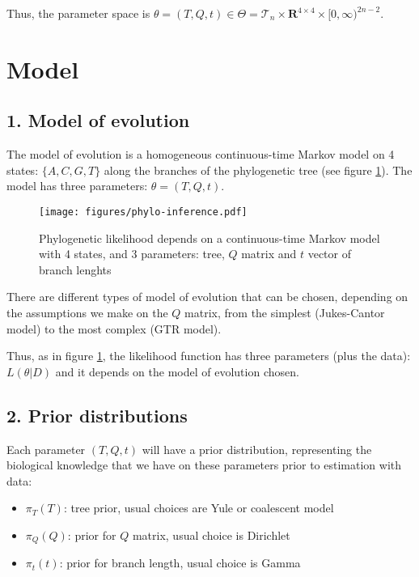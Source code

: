 \documentclass[]{article}
\providecommand{\tightlist}{%
  \setlength{\itemsep}{0pt}\setlength{\parskip}{0pt}}
\begin{document}
Thus, the parameter space is
\(\theta = (T,Q,t) \in \Theta = \mathcal{T}_n \times \mathbf{R}^{4 \times 4} \times [0,\infty)^{2n-2}\).

\hypertarget{model}{%
\section{Model}\label{model}}

\hypertarget{model-of-evolution}{%
\subsection{1. Model of evolution}\label{model-of-evolution}}

The model of evolution is a homogeneous continuous-time Markov model on
4 states: \(\{A,C,G,T\}\) along the branches of the phylogenetic tree
(see figure \ref{phylo-inf}). The model has three parameters:
\(\theta = (T,Q,t)\).

\begin{figure}[ht]
\centering
\texttt{[image: figures/phylo-inference.pdf]}
\caption{Phylogenetic likelihood depends on a continuous-time Markov model with 4 states, and 3 parameters: tree, $Q$ matrix and $t$ vector of branch lenghts}
\label{phylo-inf}
\end{figure}

There are different types of model of evolution that can be chosen,
depending on the assumptions we make on the \(Q\) matrix, from the
simplest (Jukes-Cantor model) to the most complex (GTR model).

Thus, as in figure \ref{phylo-inf}, the likelihood function has three
parameters (plus the data): \(L(\theta|D)\) and it depends on the model
of evolution chosen.

\hypertarget{prior-distributions}{%
\subsection{2. Prior distributions}\label{prior-distributions}}

Each parameter \((T,Q,t)\) will have a prior distribution, representing
the biological knowledge that we have on these parameters prior to
estimation with data:

\begin{itemize}
\tightlist
\item
  \(\pi_T(T)\): tree prior, usual choices are Yule or coalescent model
\item
  \(\pi_Q(Q)\): prior for \(Q\) matrix, usual choice is Dirichlet
\item
  \(\pi_t(t)\): prior for branch length, usual choice is Gamma
\end{itemize}
\end{document}
